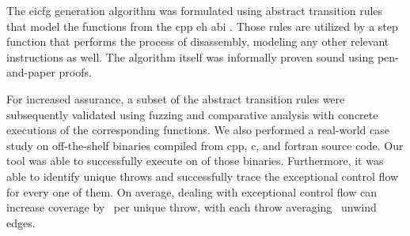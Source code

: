 The \ac{eicfg} generation algorithm was formulated using abstract transition rules that model the functions from the \gls{cpp} \ac{eh} \ac{abi} \autocite{cxxEhAbi}.
Those rules are utilized by a step function that performs the process of disassembly, modeling any other relevant instructions as well.
The algorithm itself was informally proven sound using pen-and-paper proofs.

For increased assurance, a subset of the abstract transition rules were subsequently validated using fuzzing and comparative analysis with  concrete executions of the corresponding functions.
We also performed a real-world case study on  off-the-shelf binaries compiled from \gls{cpp}, \gls{c}, and \gls{fortran} source code.
Our tool was able to successfully execute on  of those binaries.
Furthermore, it was able to identify  unique throws and successfully trace the exceptional control flow for every one of them.
On average, dealing with exceptional control flow can increase coverage by \avgdiffinst\ per unique throw, with each throw averaging \avgunwinds\ unwind edges.
